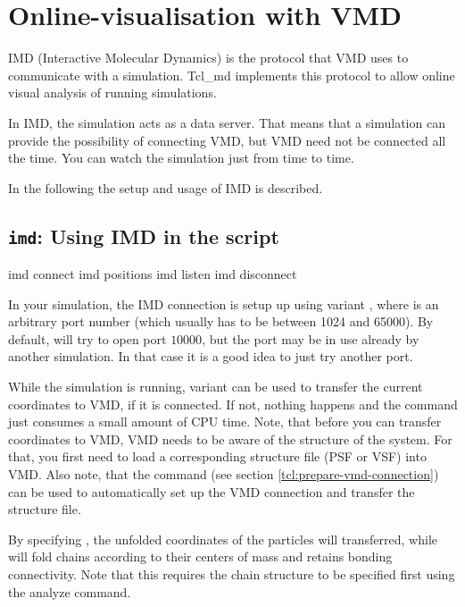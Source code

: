 \section{Online-visualisation with VMD}
IMD (Interactive Molecular Dynamics) is the protocol that VMD uses to
communicate with a simulation. Tcl\_md implements this protocol to
allow online visual analysis of running simulations.

In IMD, the simulation acts as a data server. That means that a
simulation can provide the possibility of connecting VMD, but VMD need
not be connected all the time. You can watch the simulation just from
time to time.

In the following the setup and usage of IMD is described.

\subsection{\texttt{imd}: Using IMD in the script}

\begin{essyntax}
   imd connect 
   imd positions 
   imd listen 
   imd disconnect
\end{essyntax}

In your simulation, the IMD connection is setup up using variant
, where  is an arbitrary port number (which
usually has to be between 1024 and 65000). By default, \es will try to
open port $10000$, but the port may be in use already by another \es
simulation. In that case it is a good idea to just try another port.

While the simulation is running, variant  can be used to
transfer the current coordinates to VMD, if it is connected.  If not,
nothing happens and the command just consumes a small amount of CPU
time. Note, that before you can transfer coordinates to VMD, VMD needs
to be aware of the structure of the system. For that, you first need
to load a corresponding structure file (PSF or VSF) into VMD. Also
note, that the command  (see section
\vref{tcl:prepare-vmd-connection}) can be used to automatically set up
the VMD connection and transfer the structure file.

By specifying , the unfolded coordinates of the
particles will transferred, while  will fold chains
according to their centers of mass and retains bonding connectivity.
Note that this requires the chain structure to be specified first
using the analyze command.


